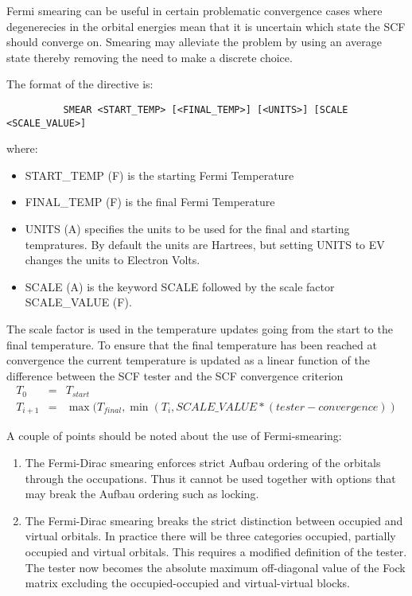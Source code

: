 \documentclass[11pt,fleqn]{article}
\begin{document}
Fermi smearing can be useful in certain problematic convergence cases
where degenerecies in the orbital energies mean that it is uncertain
which state the SCF should converge on. Smearing may alleviate the
problem by using an average state thereby removing the need to make
a discrete choice.

The format of the directive is:

{
\footnotesize
\begin{verbatim}
          SMEAR <START_TEMP> [<FINAL_TEMP>] [<UNITS>] [SCALE <SCALE_VALUE>]
\end{verbatim}
}

where:

\begin{itemize}
\item START\_TEMP (F) is the starting Fermi Temperature
\item FINAL\_TEMP (F) is the final Fermi Temperature
\item UNITS (A) specifies the units to be used for the final and
  starting tempratures. By default the units are Hartrees, but setting
  UNITS to EV changes the units to Electron Volts.
\item SCALE (A) is the keyword SCALE followed by the scale factor 
  SCALE\_VALUE (F). 
\end{itemize}
The scale factor is used in the temperature updates
going from the start to the final temperature. To ensure that the final
temperature has been reached at convergence the current temperature
is updated as a linear function of the difference between the SCF tester and
the SCF convergence criterion
\begin{eqnarray}
   T_0     &=& T_{start} \\
   T_{i+1} &=& \max(T_{final},\min(T_i, SCALE\_VALUE * (tester-convergence))
\end{eqnarray}

A couple of points should be noted about the use of Fermi-smearing:

\begin{enumerate}

\item The Fermi-Dirac smearing enforces strict Aufbau ordering of the
  orbitals through the occupations. Thus it cannot be used together
  with options that may break the Aufbau ordering such as locking.
\item The Fermi-Dirac smearing breaks the strict distinction between
  occupied and virtual orbitals. In practice there will be three categories
  occupied, partially occupied and virtual orbitals. This requires a 
  modified definition of the tester. The tester now becomes the absolute
  maximum off-diagonal value of the Fock matrix excluding the 
  occupied-occupied and virtual-virtual blocks.
\end{enumerate}
\end{document}
